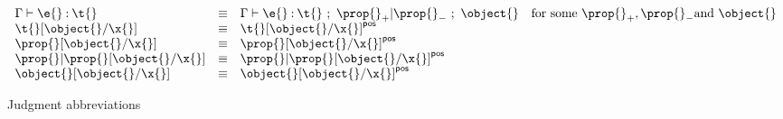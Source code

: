 \begin{figure}
$$
\begin{array}{lllr}
  \judgementtwo{\propenv{}}{\e{}}{\t{}} &\equiv& 
  \judgement{\propenv{}}{\e{}}{\t{}}{\filterset{\thenprop{\prop{}}}{\elseprop{\prop{}}}}{\object{}}
  & \text{for some}\ {\thenprop{\prop{}}}, {\elseprop{\prop{}}} \text{and}\ {\object{}}

  \\
  {\replacefor{\t{}}{\object{}}{\x{}}} &\equiv& {\pluspolarity{\replacefor{\t{}}{\object{}}{\x{}}}}
  \\
  {\replacefor{\prop{}}{\object{}}{\x{}}} &\equiv&  {\pluspolarity{\replacefor{\prop{}}{\object{}}{\x{}}}}
  \\
  {\replacefor{\filterset{\prop{}}{\prop{}}}{\object{}}{\x{}}} &\equiv&  {\pluspolarity{\replacefor{\filterset{\prop{}}{\prop{}}}{\object{}}{\x{}}}}
  \\
  {\replacefor{\object{}}{\object{}}{\x{}}} &\equiv& {\pluspolarity{\replacefor{\object{}}{\object{}}{\x{}}}}

\end{array}
$$
\caption{Judgment abbreviations}
\end{figure}
